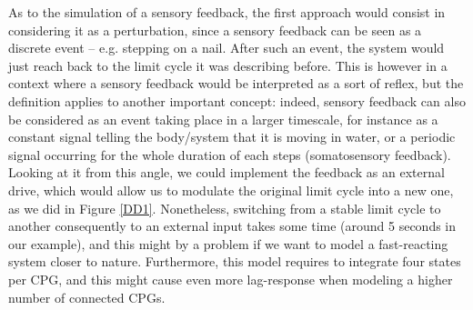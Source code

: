 \documentclass{cmc}
\begin{document}

As to the simulation of a sensory feedback, the first approach would consist in considering it as a perturbation, since a sensory feedback can be seen as a discrete event -- e.g. stepping on a nail. After such an event, the system would just reach back to the limit cycle it was describing before. This is however in a context where a sensory feedback would be interpreted as a sort of reflex, but the definition applies to another important concept: indeed, sensory feedback can also be considered as an event taking place in a larger timescale, for instance as a constant signal telling the body/system that it is moving in water, or a periodic signal occurring for the whole duration of each steps (somatosensory feedback). Looking at it from this angle, we could implement the feedback as an external drive, which would allow us to modulate the original limit cycle into a new one, as we did in Figure \ref{DD1}. Nonetheless, switching from a stable limit cycle to another consequently to an external input takes some time (around 5 seconds in our example), and this might by a problem if we want to model a fast-reacting system closer to nature. Furthermore, this model requires to integrate four states per CPG, and this might cause even more lag-response when modeling a higher number of connected CPGs.
\end{document}
